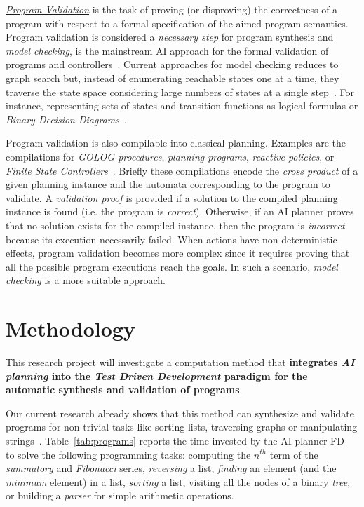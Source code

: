 \documentclass[10pt,a4paper]{paper}
\begin{document}
{\underline{\em Program Validation}} is the task of proving (or disproving) the correctness of a program with respect to a formal specification of the aimed program semantics. Program validation is considered a {\em necessary step} for program synthesis and {\em model checking}, is the mainstream AI approach for the formal validation of programs and controllers~\cite{clarke1999model}. Current approaches for model checking reduces to graph search but, instead of enumerating reachable states one at a time, they traverse the state space considering large numbers of states at a single step~\cite{mcmillan1993symbolic}. For instance, representing sets of states and transition functions as logical formulas or {\em Binary Decision Diagrams}~\cite{bryant1992symbolic}.

Program validation is also compilable into classical planning. Examples are the compilations for {\em GOLOG procedures}, {\em planning programs}, {\em reactive policies}, or {\em Finite State Controllers}~\cite{baier2007exploiting,Geffner:FSM:AAAI10,ivankovic2015optimal,sergio:aprograming:ijcai16,segovia:FSC:JAIR2018,segovia:programs:AIJ19}. Briefly these compilations encode the {\em cross product} of a given planning instance and the automata corresponding to the program to validate. A {\em validation proof} is provided if a solution to the compiled planning instance is found (i.e. the program is {\em correct}). Otherwise, if an AI planner proves that no solution exists for the compiled instance, then the program is {\em incorrect} because its execution necessarily failed. When actions have non-deterministic effects, program validation becomes more complex since it requires proving that all the possible program executions reach the goals. In such a scenario, {\em model checking} is a more suitable approach.
\newpage



\section{Methodology}
\label{sec:methodology}
This research project will investigate a computation method that {\bf integrates {\em AI planning} into the {\em Test Driven Development} paradigm for the automatic synthesis and validation of programs}. 

Our current research already shows that this method can synthesize and validate programs for non trivial tasks like sorting lists, traversing graphs or manipulating strings~\cite{jimenez2015computing,sergio:aprograming:icaps16,sergio:aprogramingb:ijcai16,sergio:aprograming:ijcai16,segovia2017generating,segovia:FSC:JAIR2018,segovia:programs:AIJ19}. Table~\ref{tab:programs} reports the time invested by the AI planner {\sc FD}~\cite{helmert2006fast} to solve the following programming tasks: computing the $n^{th}$ term of the {\em summatory} and  {\em Fibonacci} series, {\em reversing} a list, {\em finding} an element (and the {\em minimum} element) in a list, {\em sorting} a list, visiting all the nodes of a binary {\em tree}, or building a {\em parser} for simple arithmetic operations. 
 
\end{document}
